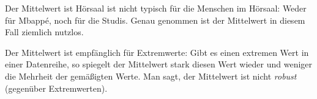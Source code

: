 \documentclass[
  letterpaper,
  DIV=11,
  numbers=noendperiod]{scrartcl}
\theoremstyle{definition}
\theoremstyle{definition}
\theoremstyle{definition}
\theoremstyle{remark}
\begin{document}
Der Mittelwert ist Hörsaal ist nicht typisch für die Menschen im
Hörsaal: Weder für Mbappé, noch für die Studis. Genau genommen ist der
Mittelwert in diesem Fall ziemlich nutzlos.

\begin{tcolorbox}[enhanced jigsaw, breakable, toptitle=1mm, colback=white, leftrule=.75mm, colframe=quarto-callout-important-color-frame, colbacktitle=quarto-callout-important-color!10!white, title=\textcolor{quarto-callout-important-color}{\faExclamation}\hspace{0.5em}{Important}, toprule=.15mm, opacityback=0, arc=.35mm, coltitle=black, rightrule=.15mm, titlerule=0mm, bottomtitle=1mm, bottomrule=.15mm, left=2mm, opacitybacktitle=0.6]

Der Mittelwert ist empfänglich für Extremwerte: Gibt es einen extremen
Wert in einer Datenreihe, so spiegelt der Mittelwert stark diesen Wert
wieder und weniger die Mehrheit der gemäßigten Werte. Man sagt, der
Mittelwert ist nicht \emph{robust} (gegenüber Extremwerten).

\end{tcolorbox}
\end{document}

